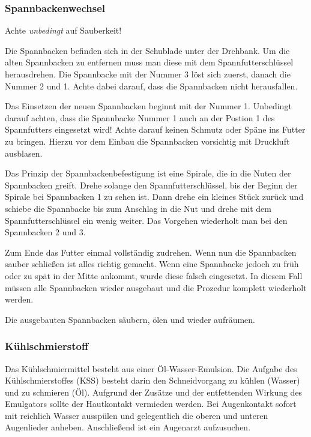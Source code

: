 \documentclass{\basedir/fablab-document}
\begin{document}
\subsubsection{Spannbackenwechsel}
\label{zerspanung:spannbackenwechsel}
Achte \emph{unbedingt} auf Sauberkeit!
 
Die Spannbacken befinden sich in der Schublade unter der Drehbank.
Um die alten Spannbacken zu entfernen muss man diese mit dem Spannfutterschlüssel herausdrehen.
Die Spannbacke mit der Nummer 3 löst sich zuerst, danach die Nummer 2 und 1.
Achte dabei darauf, dass die Spannbacken nicht herausfallen.

Das Einsetzen der neuen Spannbacken beginnt mit der Nummer 1.
Unbedingt darauf achten, dass die Spannbacke Nummer 1 auch an der Postion 1 des Spannfutters eingesetzt wird!
Achte darauf keinen Schmutz oder Späne ins Futter zu bringen. Hierzu vor dem Einbau die Spannbacken vorsichtig mit Druckluft ausblasen.

Das Prinzip der Spannbackenbefestigung ist eine Spirale, die in die Nuten der Spannbacken greift.
Drehe solange den Spannfutterschlüssel, bis der Beginn der Spirale bei Spannbacken 1 zu sehen ist.
Dann drehe ein kleines Stück zurück und schiebe die Spannbacke bis zum Anschlag in die Nut und drehe mit dem Spannfutterschlüssel ein wenig weiter.
Das Vorgehen wiederholt man bei den Spannbacken 2 und 3.

Zum Ende das Futter einmal vollständig zudrehen.
Wenn nun die Spannbacken sauber schließen ist alles richtig gemacht.
Wenn eine Spannbacke jedoch zu früh oder zu spät in der Mitte ankommt, wurde diese falsch eingesetzt.
In diesem Fall müssen alle Spannbacken wieder ausgebaut und die Prozedur komplett wiederholt werden.

Die ausgebauten Spannbacken säubern, ölen und wieder aufräumen.

\subsubsection{Kühlschmierstoff}

Das Kühlschmiermittel besteht aus einer Öl-Wasser-Emulsion.
Die Aufgabe des Kühlschmierstoffes (KSS) besteht darin den Schneidvorgang zu kühlen (Wasser) und zu schmieren (Öl).
Aufgrund der Zusätze und der entfettenden Wirkung des Emulgators sollte der Hautkontakt vermieden werden.
Bei Augenkontakt sofort mit reichlich Wasser ausspülen und gelegentlich die oberen und unteren Augenlieder anheben.
Anschließend ist ein Augenarzt aufzusuchen.
\end{document}
